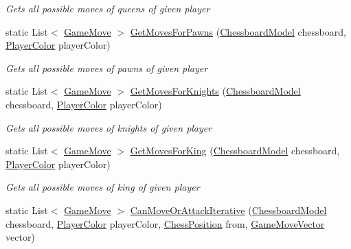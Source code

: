 \begin{DoxyCompactItemize}
\begin{DoxyCompactList}\small\item\em Gets all possible moves of queens of given player \end{DoxyCompactList}\item 
static List$<$ \mbox{\hyperlink{class_chess_tracking_1_1_game_1_1_game_move}{Game\+Move}} $>$ \mbox{\hyperlink{class_chess_tracking_1_1_game_1_1_game_validator_ae326494a4a16d134e06c1fdcfa664e31}{Get\+Moves\+For\+Pawns}} (\mbox{\hyperlink{class_chess_tracking_1_1_game_1_1_chessboard_model}{Chessboard\+Model}} chessboard, \mbox{\hyperlink{namespace_chess_tracking_1_1_game_ab79070a55977a8c8326e9cdda7dcfa9a}{Player\+Color}} player\+Color)
\begin{DoxyCompactList}\small\item\em Gets all possible moves of pawns of given player \end{DoxyCompactList}\item 
static List$<$ \mbox{\hyperlink{class_chess_tracking_1_1_game_1_1_game_move}{Game\+Move}} $>$ \mbox{\hyperlink{class_chess_tracking_1_1_game_1_1_game_validator_a991d89bd66ce11ad6dfd4299466b9150}{Get\+Moves\+For\+Knights}} (\mbox{\hyperlink{class_chess_tracking_1_1_game_1_1_chessboard_model}{Chessboard\+Model}} chessboard, \mbox{\hyperlink{namespace_chess_tracking_1_1_game_ab79070a55977a8c8326e9cdda7dcfa9a}{Player\+Color}} player\+Color)
\begin{DoxyCompactList}\small\item\em Gets all possible moves of knights of given player \end{DoxyCompactList}\item 
static List$<$ \mbox{\hyperlink{class_chess_tracking_1_1_game_1_1_game_move}{Game\+Move}} $>$ \mbox{\hyperlink{class_chess_tracking_1_1_game_1_1_game_validator_a18ce16abbc46f5d7823f26866b34cdc8}{Get\+Moves\+For\+King}} (\mbox{\hyperlink{class_chess_tracking_1_1_game_1_1_chessboard_model}{Chessboard\+Model}} chessboard, \mbox{\hyperlink{namespace_chess_tracking_1_1_game_ab79070a55977a8c8326e9cdda7dcfa9a}{Player\+Color}} player\+Color)
\begin{DoxyCompactList}\small\item\em Gets all possible moves of king of given player \end{DoxyCompactList}\item 
static List$<$ \mbox{\hyperlink{class_chess_tracking_1_1_game_1_1_game_move}{Game\+Move}} $>$ \mbox{\hyperlink{class_chess_tracking_1_1_game_1_1_game_validator_af1a68e3f4cbdbb559b47ab2cd6a58564}{Can\+Move\+Or\+Attack\+Iterative}} (\mbox{\hyperlink{class_chess_tracking_1_1_game_1_1_chessboard_model}{Chessboard\+Model}} chessboard, \mbox{\hyperlink{namespace_chess_tracking_1_1_game_ab79070a55977a8c8326e9cdda7dcfa9a}{Player\+Color}} player\+Color, \mbox{\hyperlink{class_chess_tracking_1_1_game_1_1_chess_position}{Chess\+Position}} from, \mbox{\hyperlink{class_chess_tracking_1_1_game_1_1_game_move_vector}{Game\+Move\+Vector}} vector)

\end{DoxyCompactItemize}

